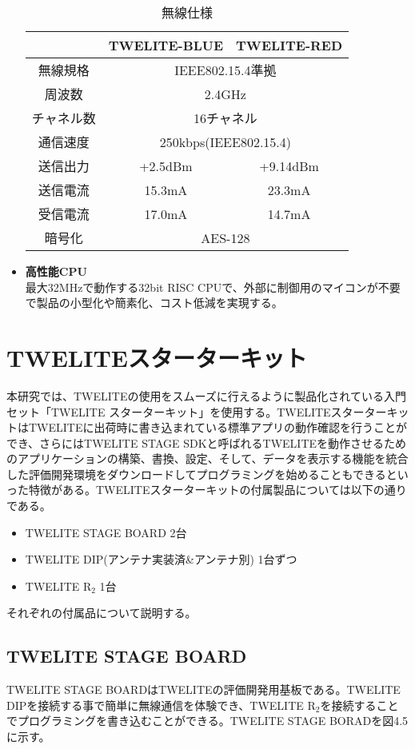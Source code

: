 \documentclass{thesis}
\begin{document}
\begin{itemize}
\begin{table}[h]
  \centering
  \caption{無線仕様}
  \begin{tabular}{|c|c|c|} \hline
　　 & TWELITE-BLUE & TWELITE-RED \\ \hline
    無線規格 & \multicolumn{2}{c|}{IEEE802.15.4準拠} \\ \hline
    周波数 & \multicolumn{2}{c|}{2.4GHz} \\ \hline
    チャネル数 & \multicolumn{2}{c|}{16チャネル} \\ \hline
    通信速度 & \multicolumn{2}{c|}{250kbps(IEEE802.15.4)} \\ \hline
    送信出力 & +2.5dBm & +9.14dBm \\ \hline
    送信電流 & 15.3mA & 23.3mA \\ \hline
    受信電流 & 17.0mA & 14.7mA \\ \hline
    暗号化 & \multicolumn{2}{c|}{AES-128} \\ \hline
  \end{tabular}
\end{table}

\item \textbf{高性能CPU} \\ 
最大32MHzで動作する32bit RISC CPUで、外部に制御用のマイコンが不要で製品の小型化や簡素化、コスト低減を実現する。
\end{itemize}

\section{TWELITEスターターキット}
本研究では、TWELITEの使用をスムーズに行えるように製品化されている入門セット「TWELITE スターターキット」を使用する。TWELITEスターターキットはTWELITEに出荷時に書き込まれている標準アプリの動作確認を行うことができ、さらにはTWELITE STAGE SDKと呼ばれるTWELITEを動作させるためのアプリケーションの構築、書換、設定、そして、データを表示する機能を統合した評価開発環境をダウンロードしてプログラミングを始めることもできるといった特徴がある。TWELITEスターターキットの付属製品については以下の通りである。
\begin{itemize}
  \item TWELITE STAGE BOARD 2台
  \item TWELITE DIP(アンテナ実装済\&アンテナ別) 1台ずつ
  \item TWELITE R$_2$ 1台
\end{itemize}

それぞれの付属品について説明する。
\subsection{TWELITE STAGE BOARD}
TWELITE STAGE BOARDはTWELITEの評価開発用基板である。TWELITE DIPを接続する事で簡単に無線通信を体験でき、TWELITE R$_2$を接続することでプログラミングを書き込むことができる。TWELITE STAGE BORADを図4.5に示す。
\end{document}
